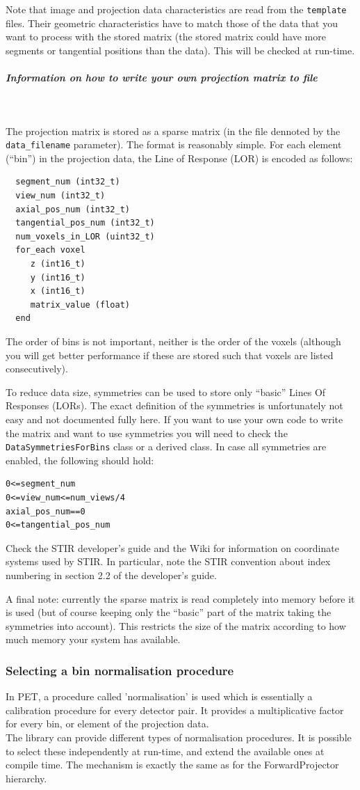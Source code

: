 \documentclass{article}
\newcommand{\subsubsubsubsection}[1]{\subparagraph{#1} \mbox{} \\}
\begin{document}
{{{{{{Note that image and projection data characteristics are read from the \texttt{template} files. Their geometric
characteristics have to match those of the data that you want to process with the stored matrix
(the stored matrix could have more segments or tangential positions than the data). This will be
checked at run-time.

{ \subsubsubsubsection{Information on how to write your own projection matrix to file}
}
The projection matrix is stored as a sparse matrix (in the file dennoted by the \texttt{data\_filename}
parameter). The format is reasonably simple. For each element (``bin'') in the projection data, the 
Line of Response (LOR) is encoded as follows:
\begin{verbatim}
  segment_num (int32_t)
  view_num (int32_t)
  axial_pos_num (int32_t)
  tangential_pos_num (int32_t)
  num_voxels_in_LOR (uint32_t)
  for_each voxel
     z (int16_t)
     y (int16_t)
     x (int16_t)
     matrix_value (float)
  end
\end{verbatim}
The order of bins is not important, neither is the order of the voxels (although you will get better
performance if these are stored such that voxels are listed consecutively).

To reduce data size, symmetries can be used to store only ``basic'' Lines Of Responses (LORs). 
The exact definition of the symmetries is unfortunately
not easy and not documented fully here. If you want to use your own code to write the matrix and want to use
symmetries you will need to check the \texttt{DataSymmetriesForBins} class or a derived class. In case all
symmetries are enabled, the following should hold:
\begin{verbatim}
0<=segment_num
0<=view_num<=num_views/4
axial_pos_num==0
0<=tangential_pos_num
\end{verbatim}
Check the STIR developer's guide and the Wiki for information on coordinate systems used by STIR. In particular,
note the STIR convention about index numbering in section 2.2 of the developer's guide.

A final note: currently the sparse matrix is read completely into memory before it is used (but of course
keeping only the ``basic'' part of the matrix taking the symmetries into account). This restricts the size
of the matrix according to how much memory your system has available.

\subsubsection{
Selecting a bin normalisation procedure}
\label{sec:binnormalisation}
In PET, a procedure called 'normalisation' is used which is essentially 
a calibration procedure for every detector pair. It provides 
a multiplicative factor for every bin, or element of the projection 
data.\\
The library can provide different types of normalisation procedures. 
It is possible to select these independently at run-time, and 
extend the available ones at compile time. The mechanism is exactly 
the same as for the ForwardProjector hierarchy.


}}}}}}
\end{document}
